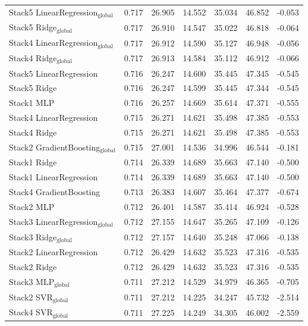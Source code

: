 \begin{table}[tp]
{\begin{tabular}{p{4.5cm}cccccc}
        Stack5 LinearRegression$_{\text{global}}$ & 0.717 & 26.905 & 14.552 & 35.034 & 46.852 & -0.053 \\
        Stack5 Ridge$_{\text{global}}$ & 0.717 & 26.910 & 14.547 & 35.022 & 46.818 & -0.064 \\
        Stack4 LinearRegression$_{\text{global}}$ & 0.717 & 26.912 & 14.590 & 35.127 & 46.948 & -0.056 \\
        Stack4 Ridge$_{\text{global}}$ & 0.717 & 26.913 & 14.584 & 35.112 & 46.912 & -0.066 \\
        Stack5 LinearRegression & 0.716 & 26.247 & 14.600 & 35.445 & 47.345 & -0.545 \\
        Stack5 Ridge & 0.716 & 26.247 & 14.599 & 35.445 & 47.344 & -0.545 \\
        Stack1 MLP & 0.716 & 26.257 & 14.669 & 35.614 & 47.371 & -0.555 \\
        Stack4 LinearRegression & 0.715 & 26.271 & 14.621 & 35.498 & 47.385 & -0.553 \\
        Stack4 Ridge & 0.715 & 26.271 & 14.621 & 35.498 & 47.385 & -0.553 \\
        Stack2 GradientBoosting$_{\text{global}}$ & 0.715 & 27.001 & 14.536 & 34.996 & 46.544 & -0.181 \\
        Stack1 Ridge & 0.714 & 26.339 & 14.689 & 35.663 & 47.140 & -0.500 \\
        Stack1 LinearRegression & 0.714 & 26.339 & 14.689 & 35.663 & 47.140 & -0.500 \\
        Stack4 GradientBoosting & 0.713 & 26.383 & 14.607 & 35.464 & 47.377 & -0.674 \\
        Stack2 MLP & 0.712 & 26.401 & 14.587 & 35.414 & 46.924 & -0.528 \\
        Stack3 LinearRegression$_{\text{global}}$ & 0.712 & 27.155 & 14.647 & 35.265 & 47.109 & -0.126 \\
        Stack3 Ridge$_{\text{global}}$ & 0.712 & 27.157 & 14.640 & 35.248 & 47.066 & -0.138 \\
        Stack2 LinearRegression & 0.712 & 26.429 & 14.632 & 35.523 & 47.316 & -0.535 \\
        Stack2 Ridge & 0.712 & 26.429 & 14.632 & 35.523 & 47.316 & -0.535 \\
        Stack3 MLP$_{\text{global}}$ & 0.711 & 27.212 & 14.529 & 34.979 & 46.365 & -0.705 \\
        Stack2 SVR$_{\text{global}}$ & 0.711 & 27.212 & 14.225 & 34.247 & 45.732 & -2.514 \\
        Stack4 SVR$_{\text{global}}$ & 0.711 & 27.225 & 14.249 & 34.305 & 46.002 & -2.559 \\

\end{tabular}}
\end{table}
